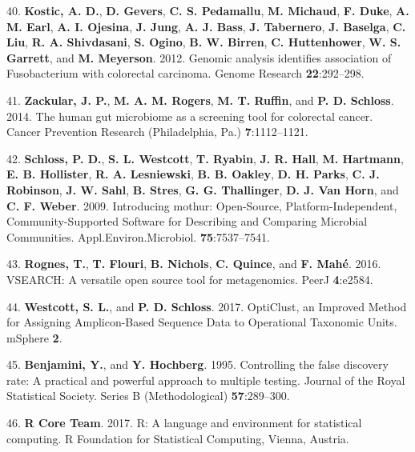 \documentclass[12pt,]{article}
\begin{document}
\hypertarget{ref-kostic_genomic_2012}{}
40. \textbf{Kostic, A. D.}, \textbf{D. Gevers}, \textbf{C. S.
Pedamallu}, \textbf{M. Michaud}, \textbf{F. Duke}, \textbf{A. M. Earl},
\textbf{A. I. Ojesina}, \textbf{J. Jung}, \textbf{A. J. Bass},
\textbf{J. Tabernero}, \textbf{J. Baselga}, \textbf{C. Liu}, \textbf{R.
A. Shivdasani}, \textbf{S. Ogino}, \textbf{B. W. Birren}, \textbf{C.
Huttenhower}, \textbf{W. S. Garrett}, and \textbf{M. Meyerson}. 2012.
Genomic analysis identifies association of Fusobacterium with colorectal
carcinoma. Genome Research \textbf{22}:292--298.

\hypertarget{ref-zackular_human_2014}{}
41. \textbf{Zackular, J. P.}, \textbf{M. A. M. Rogers}, \textbf{M. T.
Ruffin}, and \textbf{P. D. Schloss}. 2014. The human gut microbiome as a
screening tool for colorectal cancer. Cancer Prevention Research
(Philadelphia, Pa.) \textbf{7}:1112--1121.

\hypertarget{ref-schloss_introducing_2009}{}
42. \textbf{Schloss, P. D.}, \textbf{S. L. Westcott}, \textbf{T.
Ryabin}, \textbf{J. R. Hall}, \textbf{M. Hartmann}, \textbf{E. B.
Hollister}, \textbf{R. A. Lesniewski}, \textbf{B. B. Oakley}, \textbf{D.
H. Parks}, \textbf{C. J. Robinson}, \textbf{J. W. Sahl}, \textbf{B.
Stres}, \textbf{G. G. Thallinger}, \textbf{D. J. Van Horn}, and
\textbf{C. F. Weber}. 2009. Introducing mothur: Open-Source,
Platform-Independent, Community-Supported Software for Describing and
Comparing Microbial Communities. Appl.Environ.Microbiol.
\textbf{75}:7537--7541.

\hypertarget{ref-rognes_vsearch_2016}{}
43. \textbf{Rognes, T.}, \textbf{T. Flouri}, \textbf{B. Nichols},
\textbf{C. Quince}, and \textbf{F. Mahé}. 2016. VSEARCH: A versatile
open source tool for metagenomics. PeerJ \textbf{4}:e2584.

\hypertarget{ref-westcott_opticlust_2017}{}
44. \textbf{Westcott, S. L.}, and \textbf{P. D. Schloss}. 2017.
OptiClust, an Improved Method for Assigning Amplicon-Based Sequence Data
to Operational Taxonomic Units. mSphere \textbf{2}.

\hypertarget{ref-benjamini_controlling_1995}{}
45. \textbf{Benjamini, Y.}, and \textbf{Y. Hochberg}. 1995. Controlling
the false discovery rate: A practical and powerful approach to multiple
testing. Journal of the Royal Statistical Society. Series B
(Methodological) \textbf{57}:289--300.

\hypertarget{ref-r_citation_2017}{}
46. \textbf{R Core Team}. 2017. R: A language and environment for
statistical computing. R Foundation for Statistical Computing, Vienna,
Austria.
\end{document}
